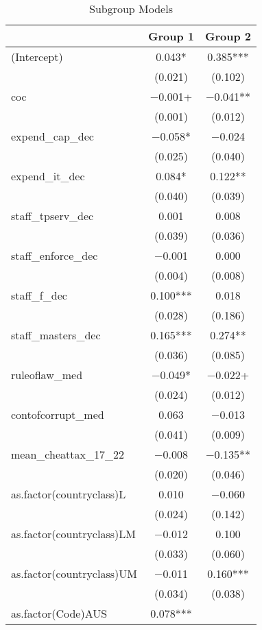 \documentclass{MSword}
\begin{document}
\begin{table}
\centering
\caption{Subgroup Models}
\label{table:2}
\begin{tabular}[t]{lcc}
\toprule
  & Group 1 & Group 2\\
\midrule
(Intercept) & \num{0.043}* & \num{0.385}***\\
 & (\num{0.021}) & (\num{0.102})\\
coc & \num{-0.001}+ & \num{-0.041}**\\
 & (\num{0.001}) & (\num{0.012})\\
expend\_cap\_dec & \num{-0.058}* & \num{-0.024}\\
 & (\num{0.025}) & (\num{0.040})\\
expend\_it\_dec & \num{0.084}* & \num{0.122}**\\
 & (\num{0.040}) & (\num{0.039})\\
staff\_tpserv\_dec & \num{0.001} & \num{0.008}\\
 & (\num{0.039}) & (\num{0.036})\\
staff\_enforce\_dec & \num{-0.001} & \num{0.000}\\
 & (\num{0.004}) & (\num{0.008})\\
staff\_f\_dec & \num{0.100}*** & \num{0.018}\\
 & (\num{0.028}) & (\num{0.186})\\
staff\_masters\_dec & \num{0.165}*** & \num{0.274}**\\
 & (\num{0.036}) & (\num{0.085})\\
ruleoflaw\_med & \num{-0.049}* & \num{-0.022}+\\
 & (\num{0.024}) & (\num{0.012})\\
contofcorrupt\_med & \num{0.063} & \num{-0.013}\\
 & (\num{0.041}) & (\num{0.009})\\
mean\_cheattax\_17\_22 & \num{-0.008} & \num{-0.135}**\\
 & (\num{0.020}) & \vphantom{1} (\num{0.046})\\
as.factor(countryclass)L & \num{0.010} & \num{-0.060}\\
 & (\num{0.024}) & (\num{0.142})\\
as.factor(countryclass)LM & \num{-0.012} & \num{0.100}\\
 & (\num{0.033}) & (\num{0.060})\\
as.factor(countryclass)UM & \num{-0.011} & \num{0.160}***\\
 & (\num{0.034}) & (\num{0.038})\\
as.factor(Code)AUS & \num{0.078}*** & \\

\end{tabular}
\end{table}
\end{document}
